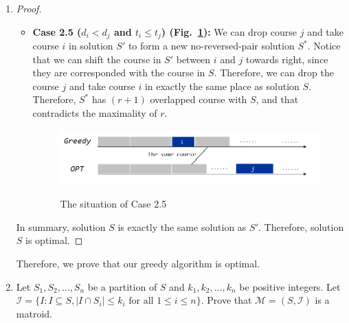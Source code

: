 \documentclass[12pt,a4paper]{article}
\makeatletter
\newtheorem*{solution}{Solution}
\theoremstyle{definition}
\renewenvironment{solution}[1][Solution] {\par\pushQED{\qed}\normalfont\topsep6\p@\@plus6\p@\relax\trivlist\item[\hskip\labelsep\bfseries#1\@addpunct{.}]\ignorespaces}{\popQED\endtrivlist\@endpefalse} \makeatother
\makeatother
\begin{document}
\begin{enumerate}
\begin{solution}
\begin{proof}
\begin{itemize}
\begin{itemize}
            \item \textbf{Case 2.5 ($d_i < d_j$ and $t_i \leq t_j$) (Fig.~\ref{fig4}):} We can drop course $j$ and take course $i$ in solution $S'$ to form a new no-reversed-pair solution $S^*$.
            Notice that we can shift the course in $S'$ between $i$ and $j$ towards right, since they are corresponded with the course in $S$. Therefore, we can drop the course $j$
            and take course $i$ in exactly the same place as solution $S$. Therefore, $S^*$ has $(r+1)$ overlapped course with $S$, and that contradicts the maximality of $r$.
            \begin{figure}[h]
              \centering
              \includegraphics[width=4in]{problem3-case2-5.png}\\
              \caption{The situation of Case 2.5}\label{fig4}
            \end{figure}
        \end{itemize}
        \end{itemize}
        In summary, solution $S$ is exactly the same solution as $S'$. Therefore, solution $S$ is optimal.
        \end{proof}
     Therefore, we prove that our greedy algorithm is optimal.
   \end{solution}
    \item
    Let $S_1,S_2,\dots,S_n$ be a partition of $S$ and $k_1,k_2,\dots,k_n$ be positive integers. Let $\mathcal{I}=\{I: I \subseteq S,|I \cap S_i| \leq k_i \text { for all } 1 \leq i \leq n\}$. Prove that $\mathcal{M}=(S,\mathcal{I})$ is a matroid.


\end{enumerate}
\end{document}
